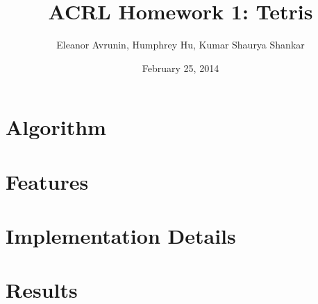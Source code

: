 \documentclass[11pt]{article}
\begin{document}
  

\title{ACRL Homework 1:  Tetris}
\date{February 25, 2014}
\author{Eleanor Avrunin, Humphrey Hu, Kumar Shaurya Shankar}

\maketitle

\section{Algorithm}


\section{Features}


\section{Implementation Details}


\section{Results}
\end{document}
